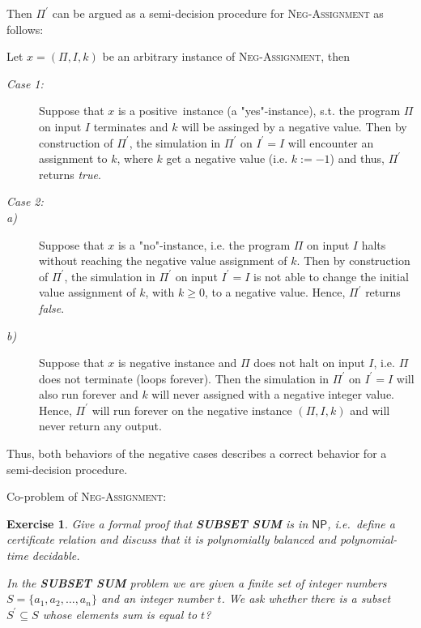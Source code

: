 \documentclass[11pt]{article}
\newtheorem{exercise}[theorem]{Exercise}
\begin{document}
Then $\Pi ^{\prime }$ can be argued as a semi-decision procedure for \textsc{%
Neg-Assignment} as follows:

Let $x=\left( \Pi ,I,k\right) $ be an arbitrary instance of \textsc{%
Neg-Assignment}, then

\begin{description}
\item[\normalfont\slshape Case 1:] Suppose that $x$ is a positive\ instance
(a "yes"-instance), s.t. the program $\Pi $ on input $I$ terminates and $k$
will be assinged by a negative value. Then by construction of $\Pi ^{\prime
} $, the simulation in $\Pi ^{\prime }$ on $I^{\prime }=I$ will encounter an
assignment to $k$, where $k$ get a negative value (i.e. $k:=-1$) and thus, $%
\Pi ^{\prime }$ returns \textit{true}.

\item[\normalfont\slshape Case 2:] 

\item[\textit{a)}] Suppose that $x$ is a "no"-instance, i.e. the program $%
\Pi $ on input $I$ halts without reaching the negative value assignment of $%
k $. Then by construction of $\Pi ^{\prime }$, the simulation in $\Pi
^{\prime }$ on input $I^{\prime }=I$ is not able to change the initial value
assignment of $k$, with $k\geq 0$, to a negative value. Hence, $\Pi ^{\prime
}$ returns \textit{false}.

\item[\textit{b)}] Suppose that $x$ is negative instance and $\Pi $ does not
halt on input $I$, i.e. $\Pi $ does not terminate (loops forever). Then the
simulation in $\Pi ^{\prime }$ on $I^{\prime }=I$ will also run forever and $%
k$ will never assigned with a negative integer value. Hence, $\Pi ^{\prime }$
will run forever on the negative instance $(\Pi ,I,k)$ and will never return
any output.
\end{description}

Thus, both behaviors of the negative cases describes a correct behavior for
a semi-decision procedure.

\medskip

Co-problem of \textsc{Neg-Assignment}:

\bigskip

\begin{exercise}
Give a formal proof that \textbf{SUBSET SUM} is in $\mathsf{NP}$,
i.e.\thinspace\ define a certificate relation and discuss that it is
polynomially balanced and polynomial-time decidable.

\smallskip

\noindent In the \textbf{SUBSET SUM} problem we are given a finite set of
integer numbers $S=\{a_{1},a_{2},\ldots ,a_{n}\}$ and an integer number $t$.
We ask whether there is a subset $S^{\prime }\subseteq S$ whose elements sum
is equal to $t$?
\end{exercise}
\end{document}
